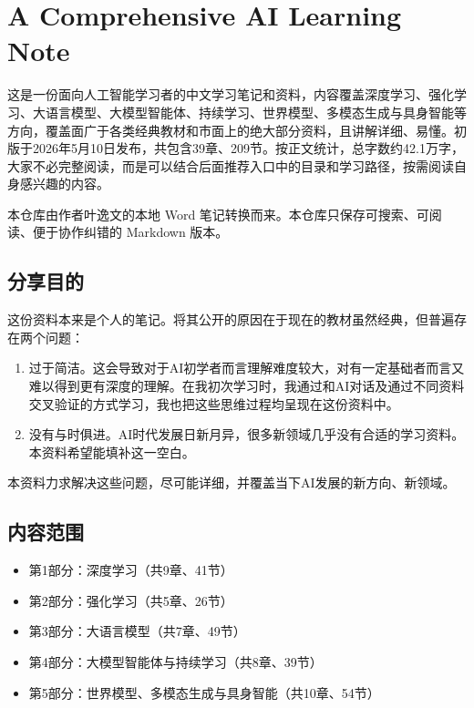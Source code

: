 \hypertarget{a-comprehensive-ai-learning-note}{%
\chapter{A Comprehensive AI Learning Note}\label{a-comprehensive-ai-learning-note}}

这是一份面向人工智能学习者的中文学习笔记和资料，内容覆盖深度学习、强化学习、大语言模型、大模型智能体、持续学习、世界模型、多模态生成与具身智能等方向，覆盖面广于各类经典教材和市面上的绝大部分资料，且讲解详细、易懂。初版于2026年5月10日发布，共包含39章、209节。按正文统计，总字数约42.1万字，大家不必完整阅读，而是可以结合后面推荐入口中的目录和学习路径，按需阅读自身感兴趣的内容。

本仓库由作者叶逸文的本地 Word 笔记转换而来。本仓库只保存可搜索、可阅读、便于协作纠错的 Markdown 版本。

\hypertarget{ux5206ux4eabux76eeux7684}{%
\section{分享目的}\label{ux5206ux4eabux76eeux7684}}

这份资料本来是个人的笔记。将其公开的原因在于现在的教材虽然经典，但普遍存在两个问题：

\begin{enumerate}
\def\labelenumi{\arabic{enumi}.}
\item
  过于简洁。这会导致对于AI初学者而言理解难度较大，对有一定基础者而言又难以得到更有深度的理解。在我初次学习时，我通过和AI对话及通过不同资料交叉验证的方式学习，我也把这些思维过程均呈现在这份资料中。
\item
  没有与时俱进。AI时代发展日新月异，很多新领域几乎没有合适的学习资料。本资料希望能填补这一空白。
\end{enumerate}

本资料力求解决这些问题，尽可能详细，并覆盖当下AI发展的新方向、新领域。

\hypertarget{ux5185ux5bb9ux8303ux56f4}{%
\section{内容范围}\label{ux5185ux5bb9ux8303ux56f4}}

\begin{itemize}
\tightlist
\item
  第1部分：深度学习（共9章、41节）
\item
  第2部分：强化学习（共5章、26节）
\item
  第3部分：大语言模型（共7章、49节）
\item
  第4部分：大模型智能体与持续学习（共8章、39节）
\item
  第5部分：世界模型、多模态生成与具身智能（共10章、54节）
\end{itemize}

